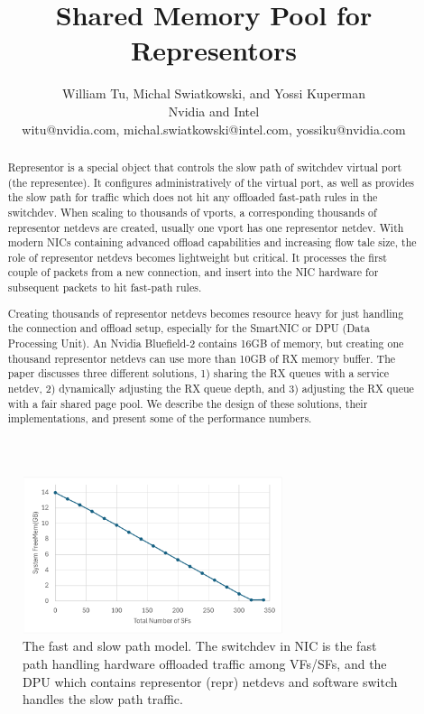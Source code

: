 \documentclass[letterpaper]{article}
\title{Shared Memory Pool for Representors}
\author{William Tu, Michal Swiatkowski, and Yossi Kuperman\\
Nvidia and Intel\\
witu@nvidia.com, michal.swiatkowski@intel.com, yossiku@nvidia.com\\
\newline
\newline
}
\begin{document}
 
\maketitle

\begin{abstract}
Representor is a special object that controls the slow path of
switchdev virtual port (the representee). It configures administratively
of the virtual port, as well as provides the slow path for traffic which
does not hit any offloaded fast-path rules in the switchdev.
When scaling to thousands of vports, a corresponding thousands of
representor netdevs are created, usually one vport has one representor
netdev. With modern NICs containing advanced offload capabilities
and increasing flow tale size, the role of representor netdevs becomes
lightweight but critical. It processes the first couple of packets
from a new connection, and insert into the NIC hardware for
subsequent packets to hit fast-path rules. 

Creating thousands of representor netdevs becomes resource heavy for
just handling the connection and offload setup, especially for the SmartNIC or
DPU (Data Processing Unit). An Nvidia Bluefield-2 contains 16GB
of memory, but creating one thousand representor netdevs can use
more than 10GB of RX memory buffer.
The paper discusses three different solutions, 1) sharing the RX queues
with a service netdev, 2) dynamically adjusting the RX queue depth,
and 3) adjusting the RX queue with a fair shared page pool.
We describe the design of these solutions, their implementations,
and present some of the performance numbers.


\end{abstract}
\begin{figure}[h]
\includegraphics[width=3in]{freemem.pdf}
\caption{The fast and slow path model. The switchdev in NIC is the fast path handling
hardware offloaded traffic among VFs/SFs, and the DPU which contains representor (repr) netdevs and software switch handles the slow path traffic.}
\label{fig:arch}
\end{figure}
\end{document}

